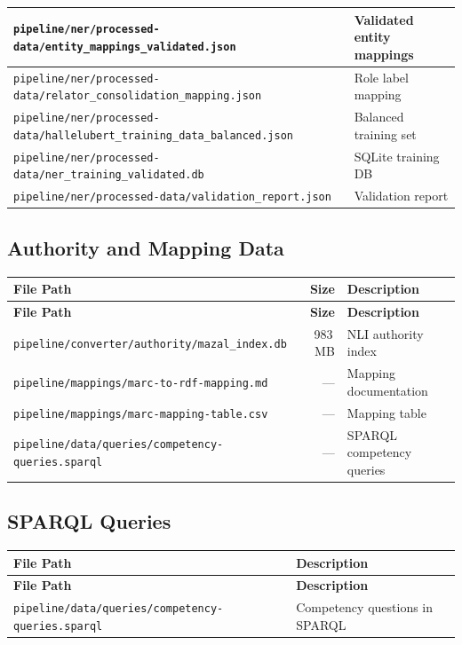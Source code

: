 \documentclass[12pt]{article}
\newcommand{\filepath}[1]{\texttt{\small #1}}
\begin{document}
\begin{longtable}{|p{9cm}|p{4cm}|}
\hline
\filepath{pipeline/ner/processed-data/entity\_mappings\_validated.json} & Validated entity mappings \\
\hline
\filepath{pipeline/ner/processed-data/relator\_consolidation\_mapping.json} & Role label mapping \\
\hline
\filepath{pipeline/ner/processed-data/hallelubert\_training\_data\_balanced.json} & Balanced training set \\
\hline
\filepath{pipeline/ner/processed-data/ner\_training\_validated.db} & SQLite training DB \\
\hline
\filepath{pipeline/ner/processed-data/validation\_report.json} & Validation report \\
\hline
\end{longtable}

\subsection{Authority and Mapping Data}

\begin{longtable}{|p{9cm}|r|p{3cm}|}
\hline
\textbf{File Path} & \textbf{Size} & \textbf{Description} \\
\hline
\endfirsthead
\hline
\textbf{File Path} & \textbf{Size} & \textbf{Description} \\
\hline
\endhead
\hline
\endfoot
\filepath{pipeline/converter/authority/mazal\_index.db} & 983\,MB & NLI authority index \\
\hline
\filepath{pipeline/mappings/marc-to-rdf-mapping.md} & --- & Mapping documentation \\
\hline
\filepath{pipeline/mappings/marc-mapping-table.csv} & --- & Mapping table \\
\hline
\filepath{pipeline/data/queries/competency-queries.sparql} & --- & SPARQL competency queries \\
\hline
\end{longtable}

\subsection{SPARQL Queries}

\begin{longtable}{|p{9cm}|p{5cm}|}
\hline
\textbf{File Path} & \textbf{Description} \\
\hline
\endfirsthead
\hline
\textbf{File Path} & \textbf{Description} \\
\hline
\endhead
\hline
\endfoot
\filepath{pipeline/data/queries/competency-queries.sparql} & Competency questions in SPARQL \\
\hline
\end{longtable}
\end{document}
